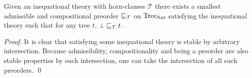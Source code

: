 \begin{lemma}
    \label{lem:freepreo}
    Given an inequational theory with horn-clauses $\mathcal{T}$
    there exists a smallest admissible 
    and compositional preorder $\sqsubseteq_\mathcal{T}$ 
    on $\textnormal{Tree}_{\textnormal{Nat}}$ satisfying the inequational theory 
    such that for any tree $t$, $\bot \sqsubseteq_\mathcal{T} t$.
\end{lemma}

\begin{proof}
    It is clear that satisfying some inequational 
    theory is stable by arbitrary intersection. Because 
    admissibility, compositionality and being 
    a preorder are also 
    stable properties by such intersection, one 
    can take the intersection of all such preorders.
\qed\end{proof}
